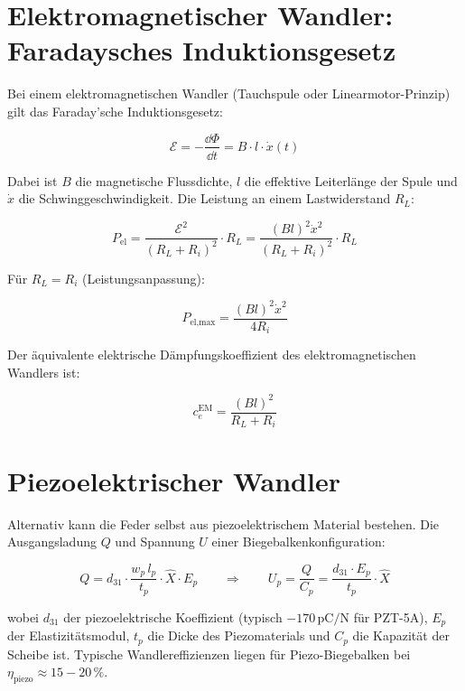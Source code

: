 ﻿\documentclass[12pt, a4paper]{report}
\theoremstyle{definition}
\theoremstyle{remark}
\begin{document}
\section{Elektromagnetischer Wandler: Faradaysches Induktionsgesetz}

Bei einem elektromagnetischen Wandler (Tauchspule oder Linearmotor-Prinzip)
gilt das Faraday'sche Induktionsgesetz:

\begin{equation}
  \mathcal{E} = -\frac{\dd\Phi}{\dd t} = B \cdot l \cdot \dot{x}(t)
  \label{eq:emk}
\end{equation}

Dabei ist $B$ die magnetische Flussdichte, $l$ die effektive Leiterlänge der
Spule und $\dot{x}$ die Schwinggeschwindigkeit. Die Leistung an einem
Lastwiderstand $R_L$:

\begin{equation}
  P_{\text{el}} = \frac{\mathcal{E}^2}{(R_L + R_i)^2} \cdot R_L
  = \frac{(Bl)^2 \dot{x}^2}{(R_L + R_i)^2} \cdot R_L
  \label{eq:p_el_em}
\end{equation}

Für $R_L = R_i$ (Leistungsanpassung):

\begin{equation}
  P_{\text{el,max}} = \frac{(Bl)^2 \dot{x}^2}{4 R_i}
  \label{eq:p_el_em_max}
\end{equation}

Der äquivalente elektrische Dämpfungskoeffizient des elektromagnetischen
Wandlers ist:

\begin{equation}
  c_e^{\text{EM}} = \frac{(Bl)^2}{R_L + R_i}
  \label{eq:ce_em}
\end{equation}

\section{Piezoelektrischer Wandler}

Alternativ kann die Feder selbst aus piezoelektrischem Material bestehen.
Die Ausgangsladung $Q$ und Spannung $U$ einer Biegebalkenkonfiguration:

\begin{equation}
  Q = d_{31} \cdot \frac{w_p \, l_p}{t_p} \cdot \hat{X} \cdot E_p
  \qquad \Rightarrow \qquad
  U_p = \frac{Q}{C_p} = \frac{d_{31} \cdot E_p}{t_p} \cdot \hat{X}
  \label{eq:piezo_spannung}
\end{equation}

wobei $d_{31}$ der piezoelektrische Koeffizient (typisch $-170\,\text{pC/N}$
für PZT-5A), $E_p$ der Elastizitätsmodul, $t_p$ die Dicke des Piezomaterials
und $C_p$ die Kapazität der Scheibe ist. Typische Wandlereffizienzen liegen
für Piezo-Biegebalken bei $\eta_{\text{piezo}} \approx 15-20\,\%$.
\end{document}
